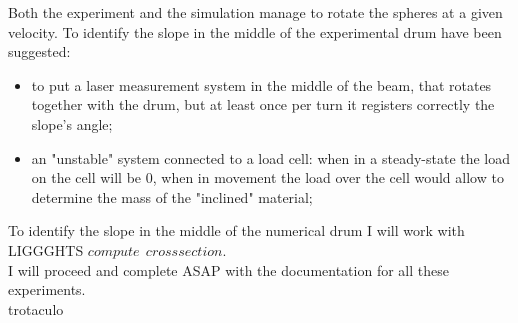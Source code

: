 Both the experiment and the simulation manage to rotate the spheres at a given velocity.
To identify the slope in the middle of the experimental drum have been suggested:
\begin{itemize}
\item{to put a laser measurement system in the middle of the beam, that rotates together with the drum, but at least once per turn it registers correctly the slope's angle;}
\item{an "unstable" system connected to a load cell: when in a steady-state the load on the cell will be $0$, when in movement the load over the cell would allow to determine the mass of the "inclined" material;}
\end{itemize}
To identify the slope in the middle of the numerical drum I will work with LIGGGHTS $compute ~~ crosssection$.\\

I will proceed and complete ASAP with the documentation for all these experiments.\\


trotaculo